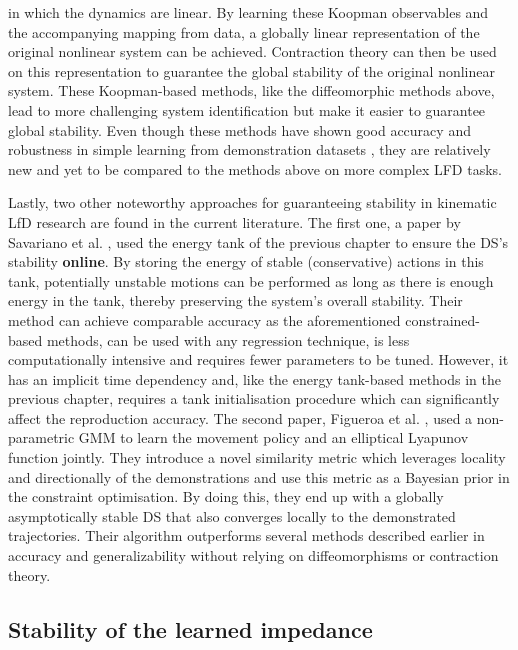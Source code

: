 in which the dynamics are linear. By learning these Koopman observables and the accompanying mapping from data, a globally linear representation of the original nonlinear system can be achieved. Contraction theory can then be used on this representation to guarantee the global stability of the original nonlinear system. These Koopman-based methods, like the diffeomorphic methods above, lead to more challenging system identification but make it easier to guarantee global stability. Even though these methods have shown good accuracy and robustness in simple learning from demonstration datasets \cite{fanLearningStableKoopman2021,bevandaDiffeomorphicallyLearningStable2022}, they are relatively new and yet to be compared to the methods above on more complex LFD tasks.

Lastly, two other noteworthy approaches for guaranteeing stability in kinematic LfD research are found in the current literature. The first one, a paper by Savariano et al. \cite{saverianoEnergybasedApproachEnsure2020}, used the energy tank of the previous chapter to ensure the DS's stability \textbf{online}. By storing the energy of stable (conservative) actions in this tank, potentially unstable motions can be performed as long as there is enough energy in the tank, thereby preserving the system's overall stability. Their method can achieve comparable accuracy as the aforementioned constrained-based methods, can be used with any regression technique, is less computationally intensive and requires fewer parameters to be tuned. However, it has an implicit time dependency and, like the energy tank-based methods in the previous chapter, requires a tank initialisation procedure which can significantly affect the reproduction accuracy. The second paper, Figueroa et al. \cite{figueroafernandezPhysicallyconsistentBayesianNonparametric2018}, used a non-parametric GMM to learn the movement policy and an elliptical Lyapunov function jointly. They introduce a novel similarity metric which leverages locality and directionally of the demonstrations and use this metric as a Bayesian prior in the constraint optimisation. By doing this, they end up with a globally asymptotically stable DS that also converges locally to the demonstrated trajectories. Their algorithm outperforms several methods described earlier in accuracy and generalizability without relying on diffeomorphisms or contraction theory.

\subsection{Stability of the learned impedance}

